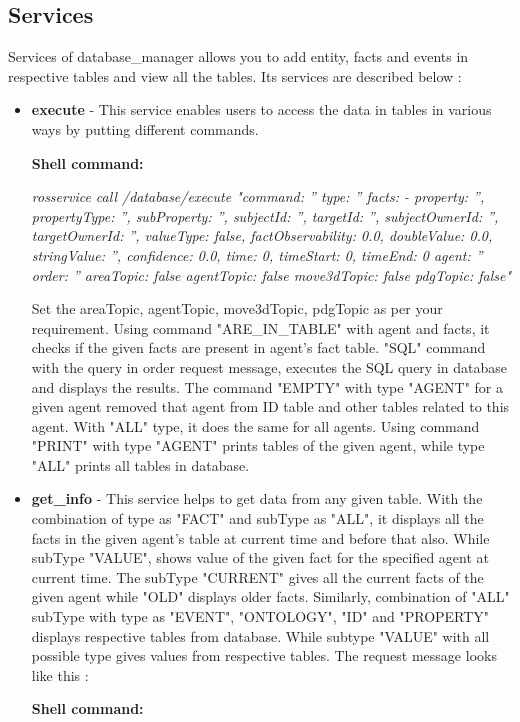 \documentclass[a4paper]{article}
\begin{document}
\subsection{Services}
Services of database\_manager allows you to add entity, facts and events in respective tables and view all the tables. Its services are described below :
\begin{itemize}
\item \textbf {execute} - This service enables users to access the data in tables in various ways by putting different commands.

\textbf{Shell command:}

\textit{rosservice call /database/execute "command: ''
type: ''
facts:
- {property: '', propertyType: '', subProperty: '', subjectId: '', targetId: '', subjectOwnerId: '',
  targetOwnerId: '', valueType: false, factObservability: 0.0, doubleValue: 0.0, stringValue: '',
  confidence: 0.0, time: 0, timeStart: 0, timeEnd: 0}
agent: ''
order: ''
areaTopic: false
agentTopic: false
move3dTopic: false
pdgTopic: false" 
}

Set the areaTopic, agentTopic, move3dTopic, pdgTopic as per your requirement. Using command "ARE\_IN\_TABLE" with agent and facts, it checks if the given facts are present in agent's fact table. "SQL" command with the query in order request message, executes the SQL query in database and displays the results. The command "EMPTY" with type "AGENT" for a given agent removed that agent from ID table and other tables related to this agent. With "ALL" type, it does the same for all agents. Using command "PRINT" with type "AGENT" prints tables of the given agent, while type "ALL" prints all tables in database.

\item \textbf {get\_info} - This service helps to get data from any given table. With the combination of type as "FACT" and subType as "ALL", it displays all the facts in the given agent's table at current time and before that also. While subType "VALUE", shows value of the given fact for the specified agent at current time. The subType "CURRENT" gives all the current facts of the given agent while "OLD" displays older facts. Similarly, combination of "ALL" subType with type as "EVENT", "ONTOLOGY", "ID" and "PROPERTY" displays respective tables from database. While subtype "VALUE" with all possible type gives values from respective tables. The request message looks like this :

\textbf{Shell command:}


\end{itemize}
\end{document}
